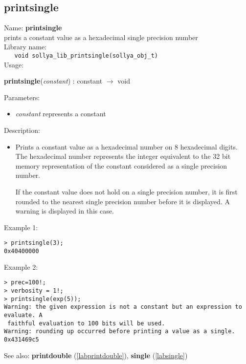 \subsection{printsingle}
\label{labprintsingle}
\noindent Name: \textbf{printsingle}\\
\phantom{aaa}prints a constant value as a hexadecimal single precision number\\[0.2cm]
\noindent Library name:\\
\verb|   void sollya_lib_printsingle(sollya_obj_t)|\\[0.2cm]
\noindent Usage: 
\begin{center}
\textbf{printsingle}(\emph{constant}) : \textsf{constant} $\rightarrow$ \textsf{void}\\
\end{center}
Parameters: 
\begin{itemize}
\item \emph{constant} represents a constant
\end{itemize}
\noindent Description: \begin{itemize}

\item Prints a constant value as a hexadecimal number on 8 hexadecimal
   digits. The hexadecimal number represents the integer equivalent to
   the 32 bit memory representation of the constant considered as a
   single precision number.
    
   If the constant value does not hold on a single precision number, it
   is first rounded to the nearest single precision number before it is
   displayed. A warning is displayed in this case.
\end{itemize}
\noindent Example 1: 
\begin{center}\begin{minipage}{15cm}\begin{Verbatim}[frame=single]
> printsingle(3);
0x40400000
\end{Verbatim}
\end{minipage}\end{center}
\noindent Example 2: 
\begin{center}\begin{minipage}{15cm}\begin{Verbatim}[frame=single]
> prec=100!;
> verbosity = 1!;
> printsingle(exp(5));
Warning: the given expression is not a constant but an expression to evaluate. A
 faithful evaluation to 100 bits will be used.
Warning: rounding up occurred before printing a value as a single.
0x431469c5
\end{Verbatim}
\end{minipage}\end{center}
See also: \textbf{printdouble} (\ref{labprintdouble}), \textbf{single} (\ref{labsingle})
